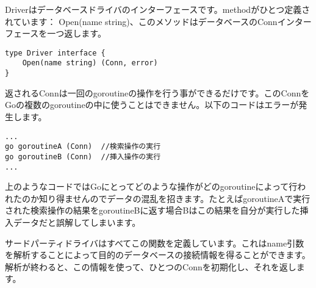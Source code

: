 Driverはデータベースドライバのインターフェースです。methodがひとつ定義されています： Open(name string)、このメソッドはデータベースのConnインターフェースを一つ返します。

\begin{lstlisting}[numbers=none]
type Driver interface {
    Open(name string) (Conn, error)
}
\end{lstlisting}

返されるConnは一回のgoroutineの操作を行う事ができるだけです。このConnをGoの複数のgoroutineの中に使うことはできません。以下のコードはエラーが発生します。

\begin{lstlisting}[numbers=none]
...
go goroutineA (Conn)  //検索操作の実行
go goroutineB (Conn)  //挿入操作の実行
...

\end{lstlisting}

上のようなコードではGoにとってどのような操作がどのgoroutineによって行われたのか知り得ませんのでデータの混乱を招きます。たとえばgoroutineAで実行された検索操作の結果をgoroutineBに返す場合Bはこの結果を自分が実行した挿入データだと誤解してしまいます。

サードパーティドライバはすべてこの関数を定義しています。これはname引数を解析することによって目的のデータベースの接続情報を得ることができます。解析が終わると、この情報を使って、ひとつのConnを初期化し、それを返します。


